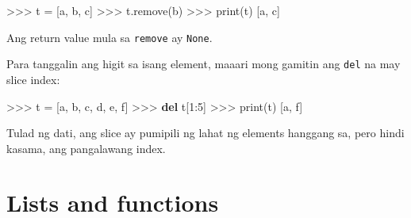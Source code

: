 \documentclass[10pt,]{book}
\newenvironment{Shaded}{}{}
\newcommand{\BuiltInTok}[1]{\textcolor[rgb]{0.00,0.50,0.00}{#1}}
\newcommand{\DecValTok}[1]{\textcolor[rgb]{0.25,0.63,0.44}{#1}}
\newcommand{\KeywordTok}[1]{\textcolor[rgb]{0.00,0.44,0.13}{\textbf{#1}}}
\newcommand{\NormalTok}[1]{#1}
\newcommand{\OperatorTok}[1]{\textcolor[rgb]{0.40,0.40,0.40}{#1}}
\newcommand{\StringTok}[1]{\textcolor[rgb]{0.25,0.44,0.63}{#1}}
\begin{document}
\begin{Shaded}
\begin{Highlighting}[]
\OperatorTok{\textgreater{}\textgreater{}\textgreater{}}\NormalTok{ t }\OperatorTok{=}\NormalTok{ [}\StringTok{\textquotesingle{}a\textquotesingle{}}\NormalTok{, }\StringTok{\textquotesingle{}b\textquotesingle{}}\NormalTok{, }\StringTok{\textquotesingle{}c\textquotesingle{}}\NormalTok{]}
\OperatorTok{\textgreater{}\textgreater{}\textgreater{}}\NormalTok{ t.remove(}\StringTok{\textquotesingle{}b\textquotesingle{}}\NormalTok{)}
\OperatorTok{\textgreater{}\textgreater{}\textgreater{}} \BuiltInTok{print}\NormalTok{(t)}
\NormalTok{[}\StringTok{\textquotesingle{}a\textquotesingle{}}\NormalTok{, }\StringTok{\textquotesingle{}c\textquotesingle{}}\NormalTok{]}
\end{Highlighting}
\end{Shaded}

Ang return value mula sa \texttt{remove} ay \texttt{None}.

 

Para tanggalin ang higit sa isang element, maaari mong gamitin ang
\texttt{del} na may slice index:

\begin{Shaded}
\begin{Highlighting}[]
\OperatorTok{\textgreater{}\textgreater{}\textgreater{}}\NormalTok{ t }\OperatorTok{=}\NormalTok{ [}\StringTok{\textquotesingle{}a\textquotesingle{}}\NormalTok{, }\StringTok{\textquotesingle{}b\textquotesingle{}}\NormalTok{, }\StringTok{\textquotesingle{}c\textquotesingle{}}\NormalTok{, }\StringTok{\textquotesingle{}d\textquotesingle{}}\NormalTok{, }\StringTok{\textquotesingle{}e\textquotesingle{}}\NormalTok{, }\StringTok{\textquotesingle{}f\textquotesingle{}}\NormalTok{]}
\OperatorTok{\textgreater{}\textgreater{}\textgreater{}} \KeywordTok{del}\NormalTok{ t[}\DecValTok{1}\NormalTok{:}\DecValTok{5}\NormalTok{]}
\OperatorTok{\textgreater{}\textgreater{}\textgreater{}} \BuiltInTok{print}\NormalTok{(t)}
\NormalTok{[}\StringTok{\textquotesingle{}a\textquotesingle{}}\NormalTok{, }\StringTok{\textquotesingle{}f\textquotesingle{}}\NormalTok{]}
\end{Highlighting}
\end{Shaded}

Tulad ng dati, ang slice ay pumipili ng lahat ng elements hanggang sa,
pero hindi kasama, ang pangalawang index.

\section{Lists and functions}\label{lists-and-functions}
\end{document}
